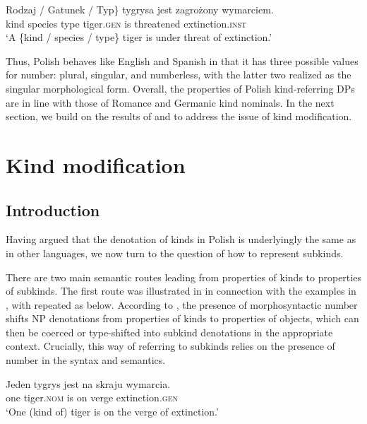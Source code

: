 \documentclass[output=paper,
colorlinks,
citecolor=brown,
newtxmath
]{langscibook}
\begin{document}
\ea \gll
\minsp{\{} Rodzaj / Gatunek / Typ\} tygrysa jest zagrożony wymarciem.\\
{} kind {} species {} type tiger.\textsc{gen} is threatened extinction.\textsc{inst}\\
\glt `A \{kind / species / type\} tiger is under threat of extinction.'
\label{ex:tiger_class}
\z

\noindent
Thus, Polish behaves like English and Spanish in that it has three possible values for number: plural, singular, and numberless, with the latter two realized as the singular morphological form. Overall, the properties of Polish kind-referring DPs are in line with those of Romance and Germanic kind nominals.
In the next section, we build on the results of  and  to address the issue of kind modification.


\section{Kind modification}\label{sec:4-subkinds}

\subsection{Introduction}

Having argued that the denotation of kinds in Polish is underlyingly the same as in other languages, we now turn to the question of how to represent subkinds.

There are two main semantic routes leading from properties of kinds to properties of subkinds. The first route was illustrated in  in connection with the examples in , with  repeated as  below. According to \citeauthor{Borik.Espinal2012}, the presence of morphosyntactic number shifts NP denotations from properties of kinds to properties of objects, which can then be coerced or type-shifted into subkind denotations in the appropriate context. Crucially, this way of referring to subkinds relies on the presence of number in the syntax and semantics.

\ea \label{ex:subkind_1} \gll
Jeden tygrys jest na skraju wymarcia.\\
one tiger.\textsc{nom} is on verge extinction.\textsc{gen}\\
\glt `One (kind of) tiger is on the verge of extinction.'
\z
\end{document}
